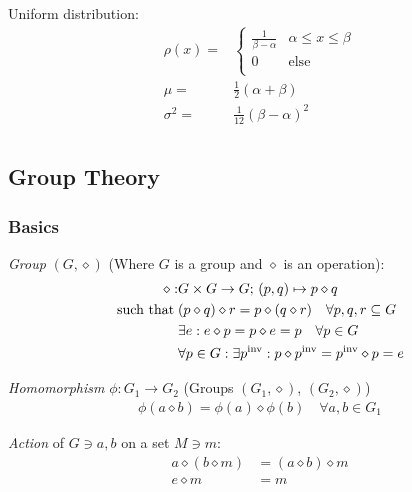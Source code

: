 			\noindent
			Uniform distribution:
			\begin{equation}
				\begin{aligned}
					\rho(x) =& \left\{\begin{array}{ll}
					\frac{1}{\beta-\alpha} & \alpha\le x\le \beta \\
					0 & \text{else} \\
					\end{array}\right. \\
					\mu =& \frac{1}{2}(\alpha+\beta) \\
					\sigma^2 =& \frac{1}{12}(\beta-\alpha)^2 \\
				\end{aligned}
			\end{equation}

	\subsection{Group Theory}
		\subsubsection{Basics}
			\emph{Group} $(G, \diamond)$ (Where $G$ is a group and $\diamond$ is an operation):
			\begin{equation}
				\begin{aligned}
					\diamond: &G \times G \rightarrow G;\, (p,q) \mapsto p\diamond q \\
					\text{such that}\; &(p\diamond q)\diamond r = p\diamond (q\diamond r)\quad\forall{p,q,r}\subseteq G \\
					&\exists e: e\diamond p = p\diamond e = p\quad\forall p\in G\\
					&\forall p \in G: \exists {p}^\mathrm{inv}: p\diamond {p}^\mathrm{inv}= {p}^\mathrm{inv}\diamond p=e
				\end{aligned}
			\end{equation}
			
			\noindent
			\emph{Homomorphism} $\phi: G_1 \rightarrow G_2$ (Groups $(G_1,\diamond)$, $(G_2,\diamond)$)
			\begin{equation}
				\begin{aligned}
					\phi(a \diamond b) = \phi(a) \diamond \phi(b) \quad \forall a,b \in G_1
				\end{aligned}
			\end{equation}
			
			\noindent
			\emph{Action} of $G\ni a, b$ on a set $M\ni m$:
			\begin{equation}
				\begin{aligned}
					a\diamond (b\diamond m) &= (a \diamond b) \diamond m \\
					e \diamond m &= m \\
				\end{aligned}
			\end{equation}
			
